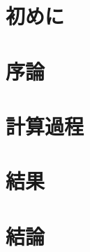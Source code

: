 \documentclass{jsarticle}
\begin{document}
\section{初めに}

\section{序論}

\section{計算過程}

\section{結果}

\section{結論}
\end{document}
